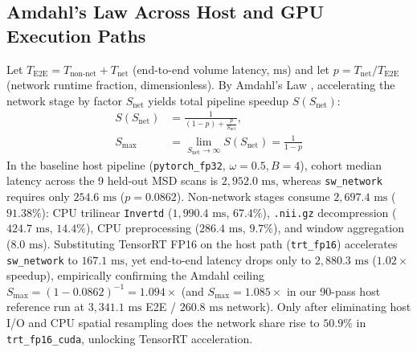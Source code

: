 \documentclass[10pt,twocolumn]{article}
\begin{document}
\subsection{Amdahl's Law Across Host and GPU Execution Paths}
Let $T_{\text{E2E}} = T_{\text{non-net}} + T_{\text{net}}$ (end-to-end volume latency, $\text{ms}$) and let $p = T_{\text{net}} / T_{\text{E2E}}$ (network runtime fraction, dimensionless). By Amdahl's Law \cite{amdahl1967}, accelerating the network stage by factor $S_{\text{net}}$ yields total pipeline speedup $S(S_{\text{net}})$:
\begin{equation}
\begin{aligned}
    S(S_{\text{net}}) &= \frac{1}{(1 - p) + \frac{p}{S_{\text{net}}}}, \\
    S_{\max} &= \lim_{S_{\text{net}} \to \infty} S(S_{\text{net}}) = \frac{1}{1 - p}
\end{aligned}
\label{eq:amdahl}
\end{equation}
In the baseline host pipeline (\texttt{pytorch\_fp32}, $\omega=0.5, B=4$), cohort median latency across the 9 held-out MSD scans is $2,952.0\text{ ms}$, whereas \texttt{sw\_network} requires only $254.6\text{ ms}$ ($p = 0.0862$). Non-network stages consume $2,697.4\text{ ms}$ ($91.38\%$): CPU trilinear \texttt{Invertd} ($1,990.4\text{ ms}$, $67.4\%$), \texttt{.nii.gz} decompression ($424.7\text{ ms}$, $14.4\%$), CPU preprocessing ($286.4\text{ ms}$, $9.7\%$), and window aggregation ($8.0\text{ ms}$). Substituting TensorRT FP16 on the host path (\texttt{trt\_fp16}) accelerates \texttt{sw\_network} to $167.1\text{ ms}$, yet end-to-end latency drops only to $2,880.3\text{ ms}$ ($1.02\times$ speedup), empirically confirming the Amdahl ceiling $S_{\max} = (1 - 0.0862)^{-1} = 1.094\times$ (and $S_{\max} = 1.085\times$ in our 90-pass host reference run at $3,341.1\text{ ms}$ E2E / $260.8\text{ ms}$ network). Only after eliminating host I/O and CPU spatial resampling does the network share rise to $50.9\%$ in \texttt{trt\_fp16\_cuda}, unlocking TensorRT acceleration.
\end{document}

